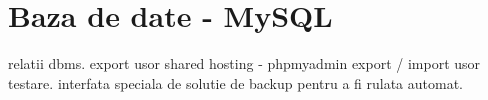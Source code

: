 \section{Baza de date - MySQL}
	relatii
	dbms.
	export usor shared hosting - phpmyadmin
	export / import usor testare.
	interfata speciala de solutie de backup pentru a fi rulata automat.